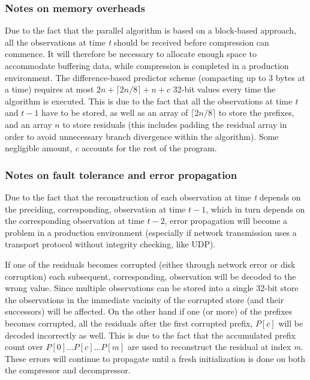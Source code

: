   \subsubsection{Notes on memory overheads}
  Due to the fact that the parallel algorithm is based on a block-based approach, all the observations at time \textit{t} should be received before compression can commence. It will therefore be necessary to allocate
  enough space to accommodate buffering data, while compression is completed in a production environment. The difference-based predictor scheme (compacting up to 3 bytes at a time) requires at most $2n + \lceil 2n/8 \rceil + n + c$ 32-bit values every 
  time the algorithm is executed. This is due to the fact that all the observations at time \textit{t} and $t-1$ have to 
  be stored, as well as an array of $\lceil 2n/8\rceil$ to store the prefixes, and an array $n$ to store residuals (this includes padding the residual array in order to avoid unnecessary branch divergence within the algorithm). Some negligible 
  amount, \textit{c} accounts for the rest of the program.
  \subsubsection{Notes on fault tolerance and error propagation}
  Due to the fact that the reconstruction of each observation at time \textit{t} depends on the preciding, corresponding, observation at time $t-1$, which in turn 
  depends on the corresponding observation at time $t-2$, error propagation will become a problem in a production environment (especially if network transmission uses a transport
  protocol without integrity checking, like UDP). 
  
  If one of the residuals becomes corrupted (either through network error or disk corruption) each subsequent, corresponding, 
  observation will be decoded to the wrong value. Since multiple observations can be stored into a single 32-bit store the observations in the immediate vacinity of the corrupted
  store (and their successors) will be affected. On the other hand if one (or more) of the prefixes becomes corrupted, all the residuals after the first corrupted prefix, $P[c]$ will be decoded 
  incorrectly as well. This is due to the fact that the accumulated prefix count over $P[0]\dots P[c]\dots P[m]$ are used to reconstruct the residual at index \textit{m}. These 
  errors will continue to propagate until a fresh initialization is done on both the compressor and decompressor. 
    
